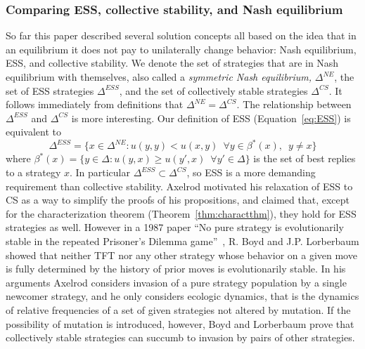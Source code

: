 \subsubsection{Comparing ESS, collective stability, and Nash equilibrium}
So far this paper described several solution concepts all based on the idea that in an equilibrium it does not pay to unilaterally change behavior: Nash equilibrium, ESS, and collective stability. We denote the set of strategies that are in Nash equilibrium with themselves, also called a \textit{symmetric Nash equilibrium,} $\Delta^{NE}$, the set of ESS strategies $\Delta^{ESS}$, and the set of collectively stable strategies $\Delta^{CS}$. It follows immediately from definitions that $\Delta^{NE} = \Delta^{CS}$. The relationship between $\Delta^{ESS}$ and $\Delta^{CS}$ is more interesting. Our definition of ESS (Equation~\ref{eq:ESS}) is equivalent to
\[
\Delta^{ESS} = \{x \in \Delta^{NE} : u(y, y) < u(x, y) \enspace \forall y \in \beta^*(x),\enspace y\neq x \}
\]
where $\beta^*(x) = \{y \in \Delta : u(y, x) \geq u(y', x) \enspace \forall y' \in \Delta\}$ is the set of best replies to a strategy $x$. In particular $\Delta^{ESS} \subset \Delta^{CS}$, so ESS is a more demanding requirement than collective stability. Axelrod motivated his relaxation of ESS to CS as a way to simplify the proofs of his propositions, and claimed that, except for the characterization theorem (Theorem~\ref{thm:charactthm}), they hold for ESS strategies as well. However in a 1987 paper ``No pure strategy is evolutionarily stable in the repeated Prisoner's Dilemma game''~\cite{Boyd_Lorberbaum_1987}, R. Boyd and J.P. Lorberbaum showed that neither TFT nor any other strategy whose behavior on a given move is fully determined by the history of prior moves is evolutionarily stable. In his arguments Axelrod considers invasion of a pure strategy population by a single newcomer strategy, and he only considers ecologic dynamics, that is the dynamics of relative frequencies of a set of given strategies not altered by mutation. If the possibility of mutation is introduced, however, Boyd and Lorberbaum prove that collectively stable strategies can succumb to invasion by pairs of other strategies.

